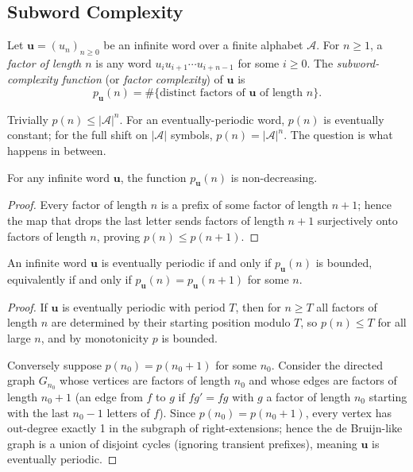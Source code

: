 \subsection{Subword Complexity}
\label{subsec:ch19-complexity}

\begin{definition}\label{def:complexity}
  Let \(\mathbf{u} = (u_n)_{n\geq 0}\) be an infinite word over a
  finite alphabet \(\mathcal{A}\).  For \(n\geq 1\), a
  \emph{factor of length \(n\)} is any word
  \(u_i u_{i+1}\cdots u_{i+n-1}\) for some \(i\geq 0\).  The
  \emph{subword-complexity function} (or \emph{factor complexity})
  of \(\mathbf{u}\) is
  \[
    p_{\mathbf{u}}(n) = \#\{\text{distinct factors of } \mathbf{u}
    \text{ of length } n\}.
  \]
\end{definition}

Trivially \(p(n)\leq |\mathcal{A}|^n\).  For an eventually-periodic
word, \(p(n)\) is eventually constant; for the full shift on
\(|\mathcal{A}|\) symbols, \(p(n)=|\mathcal{A}|^n\).  The question
is what happens in between.

\begin{lemma}\label{lem:monotone}
  For any infinite word \(\mathbf{u}\), the function
  \(p_{\mathbf{u}}(n)\) is non-decreasing.
\end{lemma}
\begin{proof}
  Every factor of length \(n\) is a prefix of some factor of length
  \(n+1\); hence the map that drops the last letter sends factors of
  length \(n+1\) surjectively onto factors of length \(n\), proving
  \(p(n)\leq p(n+1)\).
\end{proof}

\begin{lemma}\label{lem:periodic}
  An infinite word \(\mathbf{u}\) is eventually periodic if and only if
  \(p_{\mathbf{u}}(n)\) is bounded, equivalently if and only if
  \(p_{\mathbf{u}}(n)=p_{\mathbf{u}}(n+1)\) for some \(n\).
\end{lemma}
\begin{proof}
  If \(\mathbf{u}\) is eventually periodic with period \(T\), then for
  \(n\geq T\) all factors of length \(n\) are determined by their
  starting position modulo \(T\), so \(p(n)\leq T\) for all large
  \(n\), and by monotonicity \(p\) is bounded.

  Conversely suppose \(p(n_0)=p(n_0+1)\) for some \(n_0\).  Consider
  the directed graph \(G_{n_0}\) whose vertices are factors of length
  \(n_0\) and whose edges are factors of length \(n_0+1\) (an edge
  from \(f\) to \(g\) if \(fg'= fg\) with \(g\) a factor of length
  \(n_0\) starting with the last \(n_0-1\) letters of \(f\)).  Since
  \(p(n_0)=p(n_0+1)\), every vertex has out-degree exactly 1 in the
  subgraph of right-extensions; hence the de Bruijn-like graph is a
  union of disjoint cycles (ignoring transient prefixes), meaning
  \(\mathbf{u}\) is eventually periodic.
\end{proof}

